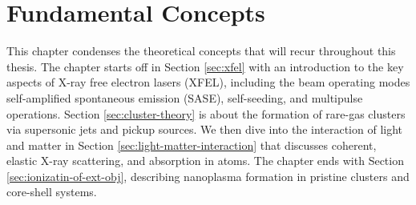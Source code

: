 \chapter{Fundamental Concepts}\label{ch:fundamental_concepts}
This chapter condenses the theoretical concepts that will recur throughout this thesis. The chapter starts off in Section \ref{sec:xfel} with an introduction to the key aspects of X-ray free electron lasers (XFEL), including the beam operating modes self-amplified spontaneous emission (SASE), self-seeding, and multipulse operations. Section \ref{sec:cluster-theory} is about the formation of rare-gas clusters via supersonic jets and pickup sources. We then dive into the interaction of light and matter in Section \ref{sec:light-matter-interaction} that discusses coherent, elastic X-ray scattering, and absorption in atoms. The chapter ends with Section \ref{sec:ionizatin-of-ext-obj}, describing nanoplasma formation in pristine clusters and core-shell systems.
%
%
%
